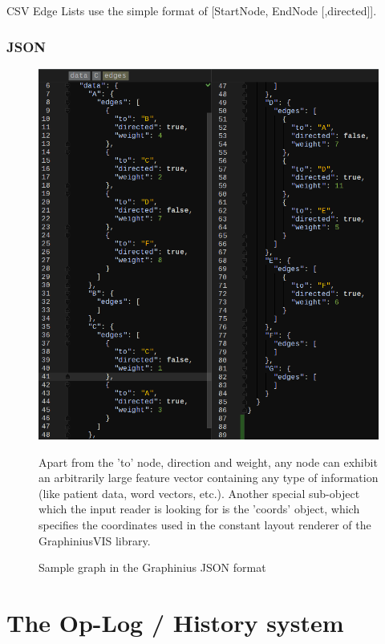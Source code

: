 		CSV Edge Lists use the simple format of [StartNode, EndNode [,directed]].		
		
		
		\subsubsection{JSON}
		\label{sssection: io_json}
		
		\begin{figure}[ht]
			\centering
			\hspace*{-1.5cm}
			\includegraphics[width=1.2\textwidth]{figures/search_graph_json}
			\caption{Sample graph in the Graphinius JSON format}
			\label{fig:json_input_graph}
			\small Apart from the 'to' node, direction and weight, any node can exhibit an arbitrarily large feature vector containing any type of information (like patient data, word vectors, etc.). Another special sub-object which the input reader is looking for is the 'coords' object, which specifies the coordinates used in the constant layout renderer of the GraphiniusVIS library.
		\end{figure}



\section{The Op-Log / History system}
\label{sect:op_log}

